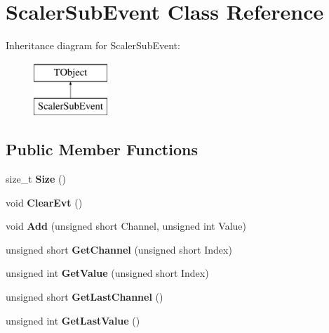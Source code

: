 \hypertarget{class_scaler_sub_event}{\section{Scaler\-Sub\-Event Class Reference}
\label{class_scaler_sub_event}
}
Inheritance diagram for Scaler\-Sub\-Event\-:\begin{figure}[H]
\begin{center}
\leavevmode
\includegraphics[height=2.000000cm]{class_scaler_sub_event}
\end{center}
\end{figure}
\subsection*{Public Member Functions}
\begin{DoxyCompactItemize}
\item 
\hypertarget{class_scaler_sub_event_a5db34a3f53c89bad6d9a961132cad259}{size\-\_\-t {\bfseries Size} ()}\label{class_scaler_sub_event_a5db34a3f53c89bad6d9a961132cad259}

\item 
\hypertarget{class_scaler_sub_event_abd5effab974e0d49409556603e614c5a}{void {\bfseries Clear\-Evt} ()}\label{class_scaler_sub_event_abd5effab974e0d49409556603e614c5a}

\item 
\hypertarget{class_scaler_sub_event_a4958f75ee49941fece531ac3924fe2e3}{void {\bfseries Add} (unsigned short Channel, unsigned int Value)}\label{class_scaler_sub_event_a4958f75ee49941fece531ac3924fe2e3}

\item 
\hypertarget{class_scaler_sub_event_ab728020f4bffbf31be733bd14be29884}{unsigned short {\bfseries Get\-Channel} (unsigned short Index)}\label{class_scaler_sub_event_ab728020f4bffbf31be733bd14be29884}

\item 
\hypertarget{class_scaler_sub_event_ac47b65fbb194003c8183db5a1a277f5d}{unsigned int {\bfseries Get\-Value} (unsigned short Index)}\label{class_scaler_sub_event_ac47b65fbb194003c8183db5a1a277f5d}

\item 
\hypertarget{class_scaler_sub_event_a3731af3cd6dbb0063051fb9a309d9c44}{unsigned short {\bfseries Get\-Last\-Channel} ()}\label{class_scaler_sub_event_a3731af3cd6dbb0063051fb9a309d9c44}

\item 
\hypertarget{class_scaler_sub_event_a9cebf7678667cbd4a8976b4544df7a1d}{unsigned int {\bfseries Get\-Last\-Value} ()}\label{class_scaler_sub_event_a9cebf7678667cbd4a8976b4544df7a1d}

\end{DoxyCompactItemize}
